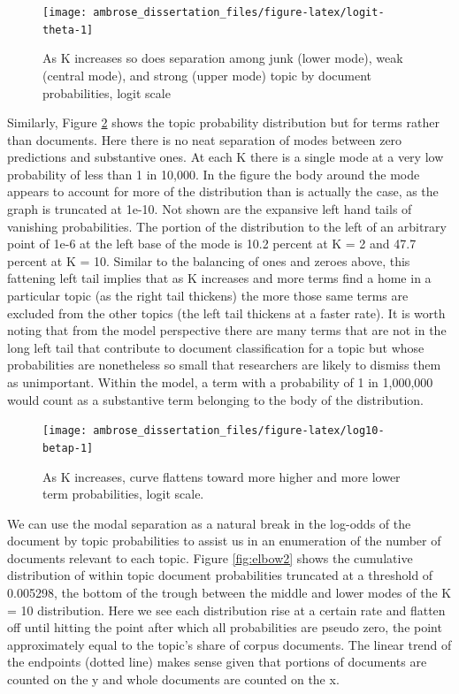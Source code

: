 \documentclass[]{book}
\theoremstyle{definition}
\theoremstyle{definition}
\theoremstyle{definition}
\theoremstyle{remark}
\begin{document}
\begin{figure}

{\centering \texttt{[image: ambrose\_dissertation\_files/figure-latex/logit-theta-1]} 

}

\caption{As K increases so does separation among junk (lower mode), weak (central mode), and strong (upper mode) topic by document probabilities, logit scale}\label{fig:logit-theta}
\end{figure}

Similarly, Figure \ref{fig:log10-betap} shows the topic probability
distribution but for terms rather than documents. Here there is no neat
separation of modes between zero predictions and substantive ones. At
each K there is a single mode at a very low probability of less than 1
in 10,000. In the figure the body around the mode appears to account for
more of the distribution than is actually the case, as the graph is
truncated at 1e-10. Not shown are the expansive left hand tails of
vanishing probabilities. The portion of the distribution to the left of
an arbitrary point of 1e-6 at the left base of the mode is 10.2 percent
at K = 2 and 47.7 percent at K = 10. Similar to the balancing of ones
and zeroes above, this fattening left tail implies that as K increases
and more terms find a home in a particular topic (as the right tail
thickens) the more those same terms are excluded from the other topics
(the left tail thickens at a faster rate). It is worth noting that from
the model perspective there are many terms that are not in the long left
tail that contribute to document classification for a topic but whose
probabilities are nonetheless so small that researchers are likely to
dismiss them as unimportant. Within the model, a term with a probability
of 1 in 1,000,000 would count as a substantive term belonging to the
body of the distribution.

\begin{figure}

{\centering \texttt{[image: ambrose\_dissertation\_files/figure-latex/log10-betap-1]} 

}

\caption{As K increases, curve flattens toward more higher and more lower term probabilities, logit scale.}\label{fig:log10-betap}
\end{figure}

We can use the modal separation as a natural break in the log-odds of
the document by topic probabilities to assist us in an enumeration of
the number of documents relevant to each topic. Figure \ref{fig:elbow2}
shows the cumulative distribution of within topic document probabilities
truncated at a threshold of 0.005298, the bottom of the trough between
the middle and lower modes of the K = 10 distribution. Here we see each
distribution rise at a certain rate and flatten off until hitting the
point after which all probabilities are pseudo zero, the point
approximately equal to the topic's share of corpus documents. The linear
trend of the endpoints (dotted line) makes sense given that portions of
documents are counted on the y and whole documents are counted on the x.
\end{document}
